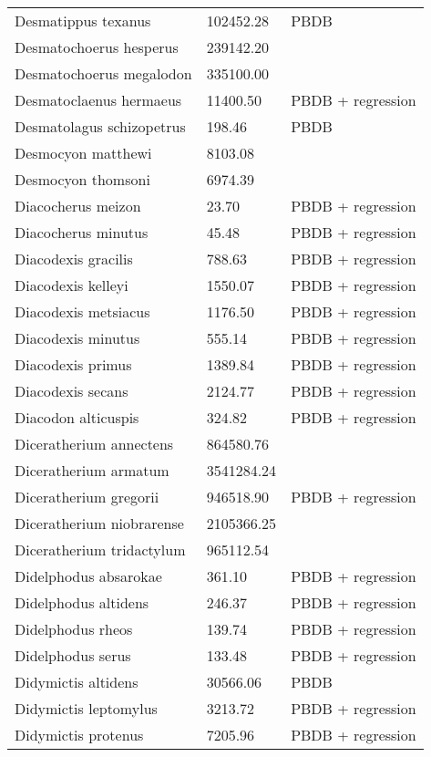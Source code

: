 \documentclass{article}
\begin{document}
\begin{center}
\begin{longtable}{p{} p{} p{} }
  Desmatippus texanus & 102452.28 & PBDB \\ 
  Desmatochoerus hesperus & 239142.20 & \cite{McGrew1939} \\ 
  Desmatochoerus megalodon & 335100.00 & \cite{McKenna2011} \\ 
  Desmatoclaenus hermaeus & 11400.50 & PBDB + regression \\ 
  Desmatolagus schizopetrus & 198.46 & PBDB \\ 
  Desmocyon matthewi & 8103.08 & \cite{Tomiya2013} \\ 
  Desmocyon thomsoni & 6974.39 & \cite{Tomiya2013} \\ 
  Diacocherus meizon & 23.70 & PBDB + regression \\ 
  Diacocherus minutus & 45.48 & PBDB + regression \\ 
  Diacodexis gracilis & 788.63 & PBDB + regression \\ 
  Diacodexis kelleyi & 1550.07 & PBDB + regression \\ 
  Diacodexis metsiacus & 1176.50 & PBDB + regression \\ 
  Diacodexis minutus & 555.14 & PBDB + regression \\ 
  Diacodexis primus & 1389.84 & PBDB + regression \\ 
  Diacodexis secans & 2124.77 & PBDB + regression \\ 
  Diacodon alticuspis & 324.82 & PBDB + regression \\ 
  Diceratherium annectens & 864580.76 & \cite{Tomiya2013} \\ 
  Diceratherium armatum & 3541284.24 & \cite{Tomiya2013} \\ 
  Diceratherium gregorii & 946518.90 & PBDB + regression \\ 
  Diceratherium niobrarense & 2105366.25 & \cite{Tomiya2013} \\ 
  Diceratherium tridactylum & 965112.54 & \cite{Tomiya2013} \\ 
  Didelphodus absarokae & 361.10 & PBDB + regression \\ 
  Didelphodus altidens & 246.37 & PBDB + regression \\ 
  Didelphodus rheos & 139.74 & PBDB + regression \\ 
  Didelphodus serus & 133.48 & PBDB + regression \\ 
  Didymictis altidens & 30566.06 & PBDB \\ 
  Didymictis leptomylus & 3213.72 & PBDB + regression \\ 
  Didymictis protenus & 7205.96 & PBDB + regression \\ 

\end{longtable}
\end{center}
\end{document}
